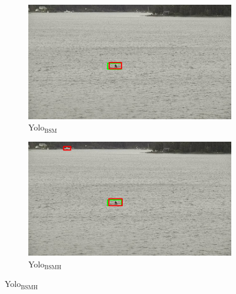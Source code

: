 \begin{figure}[h!]
\begin{subfigure}{.5\textwidth}
  \centering
  \includegraphics[width=0.9\linewidth]{results/case_buildings/yolo23/2better/yolo2/selected_08_07_frame13537.jpg}
  \caption{Yolo$_{\text{BSM}}$}
\end{subfigure}%
\begin{subfigure}{.5\textwidth}
  \centering
  \includegraphics[width=.9\linewidth]{results/case_buildings/yolo23/2better/yolo3/selected_08_07_frame13537.jpg}
  \caption{Yolo$_{\text{BSMH}}$}
\end{subfigure}


\end{figure}
